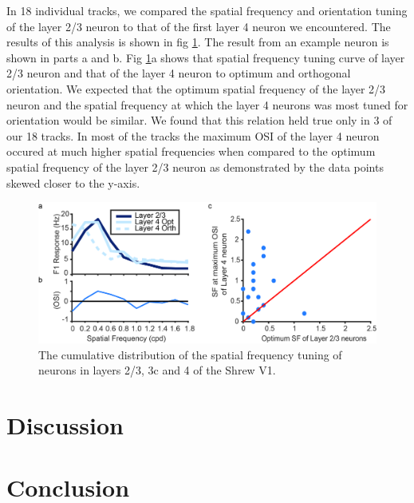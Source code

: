 In 18 individual tracks, we compared the spatial frequency and orientation tuning of the layer 2/3 neuron to that of the first layer 4 neuron we encountered. The results of this analysis is shown in fig \ref{fig:sfsum}. The result from an example neuron is shown in parts a and b. Fig \ref{fig:sfsum}a shows that spatial frequency tuning curve of layer 2/3 neuron and that of the layer 4 neuron to optimum and orthogonal orientation. We expected that the optimum spatial frequency of the layer 2/3 neuron and the spatial frequency at which the layer 4 neurons was most tuned for orientation would be similar. We found that this relation held true only in 3 of our 18 tracks. In most of the tracks the maximum OSI of the layer 4 neuron occured at much higher spatial frequencies when compared to the optimum spatial frequency of the layer 2/3 neuron as demonstrated by the data points skewed closer to the y-axis.
	\begin{figure}[H]
	
		\includegraphics[width=\linewidth]{ShrewV1/sfsummary.jpg}
		\caption{The cumulative distribution of the spatial frequency tuning of neurons in layers 2/3, 3c and 4 of the Shrew V1.}
		\label{fig:sfsum}
	\end{figure}

\section{Discussion}
\section{Conclusion}